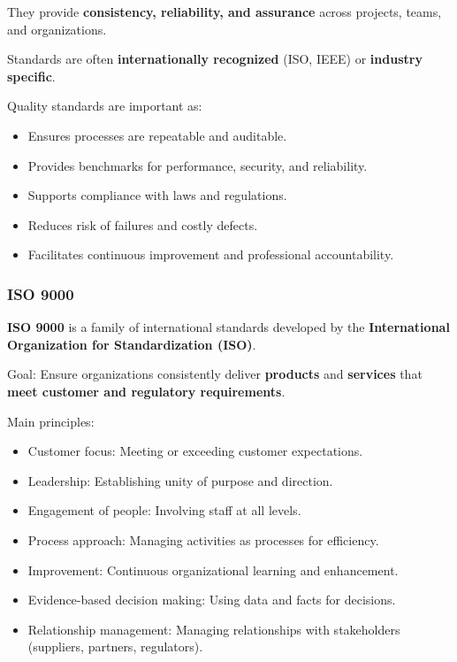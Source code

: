 \bigskip

They provide \textbf{consistency, reliability, and assurance} across projects, teams, and organizations.

Standards are often \textbf{internationally recognized} (ISO, IEEE) or \textbf{industry specific}.

Quality standards are important as:

\begin{itemize}
    \item Ensures processes are repeatable and auditable.
    \item Provides benchmarks for performance, security, and reliability.
    \item Supports compliance with laws and regulations.
    \item Reduces risk of failures and costly defects.
    \item Facilitates continuous improvement and professional accountability.
\end{itemize}

\subsubsection{ISO 9000}

\indent

\textbf{ISO 9000} is a family of international standards developed by the \textbf{International Organization for Standardization (ISO)}.

Goal: Ensure organizations consistently deliver \textbf{products} and \textbf{services} that \textbf{meet customer and regulatory requirements}.

\bigskip

\noindent Main principles:

\begin{itemize}
    \item Customer focus: Meeting or exceeding customer expectations.
    \item Leadership: Establishing unity of purpose and direction.
    \item Engagement of people: Involving staff at all levels.
    \item Process approach: Managing activities as processes for efficiency.
    \item Improvement: Continuous organizational learning and enhancement.
    \item Evidence-based decision making: Using data and facts for decisions.
    \item Relationship management: Managing relationships with stakeholders (suppliers, partners, regulators).
\end{itemize}

